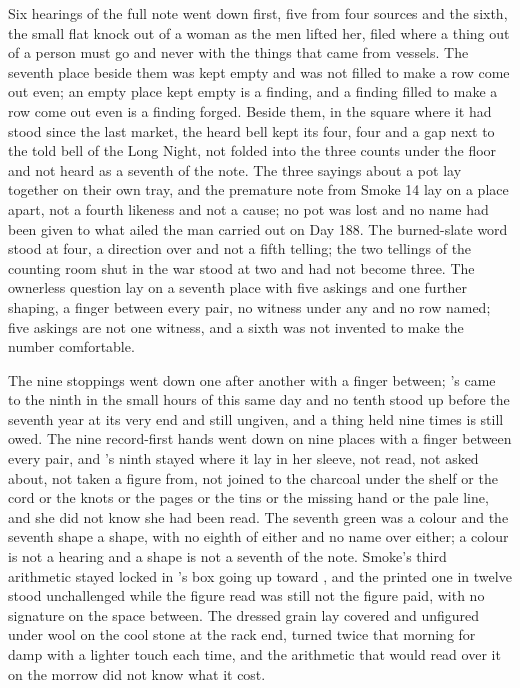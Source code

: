 Six hearings of the full note went down first, five from four sources and the sixth, the small flat knock out of a woman as the men lifted her, filed where a thing out of a person must go and never with the things that came from vessels. The seventh place beside them was kept empty and was not filled to make a row come out even; an empty place kept empty is a finding, and a finding filled to make a row come out even is a finding forged. Beside them, in the square where it had stood since the last market, the heard bell kept its four, four and a gap next to the told bell of the Long Night, not folded into the three counts under the floor and not heard as a seventh of the note. The three sayings about a pot lay together on their own tray, and the premature note from Smoke 14 lay on a place apart, not a fourth likeness and not a cause; no pot was lost and no name had been given to what ailed the man carried out on Day 188. The burned-slate word stood at four, a direction over  and not a fifth telling; the two tellings of the counting room shut in the war stood at two and had not become three. The ownerless question lay on a seventh place with five askings and one further shaping, a finger between every pair, no witness under any and no row named; five askings are not one witness, and a sixth was not invented to make the number comfortable.

The nine stoppings went down one after another with a finger between; 's came to the ninth in the small hours of this same day and no tenth stood up before the seventh year at its very end and still ungiven, and a thing held nine times is still owed. The nine record-first hands went down on nine places with a finger between every pair, and 's ninth stayed where it lay in her sleeve, not read, not asked about, not taken a figure from, not joined to the charcoal under the shelf or the cord or the knots or the pages or the tins or the missing hand or the pale line, and she did not know she had been read. The seventh green was a colour and the seventh shape a shape, with no eighth of either and no name over either; a colour is not a hearing and a shape is not a seventh of the note. Smoke's third arithmetic stayed locked in 's box going up  toward , and the printed one in twelve stood unchallenged while the figure read was still not the figure paid, with no signature on the space between. The dressed grain lay covered and unfigured under wool on the cool stone at the rack end, turned twice that morning for damp with a lighter touch each time, and the arithmetic that would read over it on the morrow did not know what it cost.

